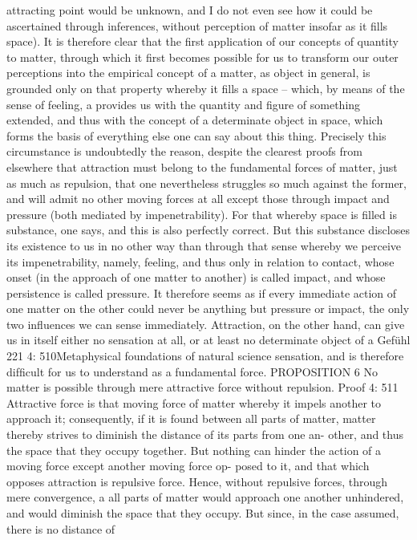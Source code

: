 attracting point would be unknown, and I do not even see how it could be
ascertained through inferences, without perception of matter insofar as
it ﬁlls space). It is therefore clear that the ﬁrst application of our concepts
of quantity to matter, through which it ﬁrst becomes possible for us to
transform our outer perceptions into the empirical concept of a matter,
as object in general, is grounded only on that property whereby it ﬁlls
a space – which, by means of the sense of feeling, a provides us with the
quantity and ﬁgure of something extended, and thus with the concept of
a determinate object in space, which forms the basis of everything else
one can say about this thing. Precisely this circumstance is undoubtedly
the reason, despite the clearest proofs from elsewhere that attraction
must belong to the fundamental forces of matter, just as much as
repulsion, that one nevertheless struggles so much against the former,
and will admit no other moving forces at all except those through impact
and pressure (both mediated by impenetrability). For that whereby space
is ﬁlled is substance, one says, and this is also perfectly correct. But this
substance discloses its existence to us in no other way than through that
sense whereby we perceive its impenetrability, namely, feeling, and thus
only in relation to contact, whose onset (in the approach of one matter
to another) is called impact, and whose persistence is called pressure. It
therefore seems as if every immediate action of one matter on the other
could never be anything but pressure or impact, the only two inﬂuences
we can sense immediately. Attraction, on the other hand, can give us
in itself either no sensation at all, or at least no determinate object of
a
Gefühl
221
4: 510Metaphysical foundations of natural science
sensation, and is therefore difﬁcult for us to understand as a fundamental
force.
PROPOSITION 6
No matter is possible through mere attractive force without repulsion.
Proof
4: 511
Attractive force is that moving force of matter whereby it impels another
to approach it; consequently, if it is found between all parts of matter,
matter thereby strives to diminish the distance of its parts from one an-
other, and thus the space that they occupy together. But nothing can
hinder the action of a moving force except another moving force op-
posed to it, and that which opposes attraction is repulsive force. Hence,
without repulsive forces, through mere convergence, a all parts of matter
would approach one another unhindered, and would diminish the space
that they occupy. But since, in the case assumed, there is no distance of
